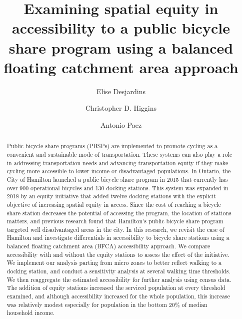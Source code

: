 \documentclass[]{elsarticle} %
\begin{document}
\begin{frontmatter}

  \title{Examining spatial equity in accessibility to a public bicycle share
program using a balanced floating catchment area approach}
    \author[Some School]{Elise Desjardins}
    \author[Another University]{Christopher D. Higgins}
    \author[Some School]{Antonio Paez}
      \address[McMaster University]{School of Earth, Environment \& Society, 1280 Main Street West,
Hamilton, ON L8S4L8}
    \address[University of Toronto Scarborough]{Department of Geography \& Planning, 1265 Military Trail, Toronto, ON
M1C1A4}
  
  \begin{abstract}
  Public bicycle share programs (PBSPs) are implemented to promote cycling
  as a convenient and sustainable mode of transportation. These systems
  can also play a role in addressing transportation needs and advancing
  transportation equity if they make cycling more accessible to lower
  income or disadvantaged populations. In Ontario, the City of Hamilton
  launched a public bicycle share program in 2015 that currently has over
  900 operational bicycles and 130 docking stations. This system was
  expanded in 2018 by an equity initiative that added twelve docking
  stations with the explicit objective of increasing spatial equity in
  access. Since the cost of reaching a bicycle share station decreases the
  potential of accessing the program, the location of stations matters,
  and previous research found that Hamilton's public bicycle share program
  targeted well disadvantaged areas in the city. In this research, we
  revisit the case of Hamilton and investigate differentials in
  accessibility to bicycle share stations using a balanced floating
  catchment area (BFCA) accessibility approach. We compare accessibility
  with and without the equity stations to assess the effect of the
  initiative. We implement our analysis parting from micro zones to better
  reflect walking to a docking station, and conduct a sensitivity analysis
  at several walking time thresholds. We then reaggregate the estimated
  accessibility for further analysis using census data. The addition of
  equity stations increased the serviced population at every threshold
  examined, and although accessibility increased for the whole population,
  this increase was relatively modest especially for population in the
  bottom 20\% of median household income.
  \end{abstract}
  
 \end{frontmatter}
\end{document}
